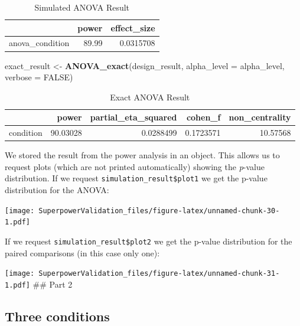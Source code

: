 \documentclass[
]{book}
\newenvironment{Shaded}{\begin{snugshade}}{\end{snugshade}}
\newcommand{\DataTypeTok}[1]{\textcolor[rgb]{0.13,0.29,0.53}{#1}}
\newcommand{\KeywordTok}[1]{\textcolor[rgb]{0.13,0.29,0.53}{\textbf{#1}}}
\newcommand{\NormalTok}[1]{#1}
\newcommand{\OtherTok}[1]{\textcolor[rgb]{0.56,0.35,0.01}{#1}}
\newcommand{\StringTok}[1]{\textcolor[rgb]{0.31,0.60,0.02}{#1}}
\begin{document}
\begin{table}[!h]

\caption{\label{tab:unnamed-chunk-27}Simulated ANOVA Result}
\centering
\begin{tabular}[t]{l|r|r}
\hline
  & power & effect\_size\\
\hline
anova\_condition & 89.99 & 0.0315708\\
\hline
\end{tabular}
\end{table}

\begin{Shaded}
\begin{Highlighting}[]
\NormalTok{exact_result <-}\StringTok{ }\KeywordTok{ANOVA_exact}\NormalTok{(design_result,}
                            \DataTypeTok{alpha_level =}\NormalTok{ alpha_level,}
                            \DataTypeTok{verbose =} \OtherTok{FALSE}\NormalTok{)}
\end{Highlighting}
\end{Shaded}

\begin{table}[!h]

\caption{\label{tab:unnamed-chunk-29}Exact ANOVA Result}
\centering
\begin{tabular}[t]{l|r|r|r|r}
\hline
  & power & partial\_eta\_squared & cohen\_f & non\_centrality\\
\hline
condition & 90.03028 & 0.0288499 & 0.1723571 & 10.57568\\
\hline
\end{tabular}
\end{table}

We stored the result from the power analysis in an object. This allows us to request plots (which are not printed automatically) showing the \emph{p}-value distribution. If we request \texttt{simulation\_result\$plot1} we get the p-value distribution for the ANOVA:

\texttt{[image: SuperpowerValidation\_files/figure-latex/unnamed-chunk-30-1.pdf]}

If we request \texttt{simulation\_result\$plot2} we get the p-value distribution for the paired comparisons (in this case only one):

\texttt{[image: SuperpowerValidation\_files/figure-latex/unnamed-chunk-31-1.pdf]}
\newpage
\#\# Part 2

\hypertarget{three-conditions}{%
\subsection{Three conditions}\label{three-conditions}}
\end{document}

